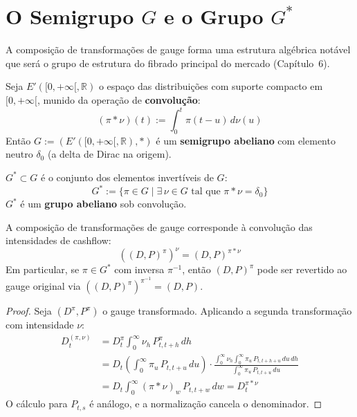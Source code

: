 \section{O Semigrupo $G$ e o Grupo $G^*$}\label{sec:semigrupo}

A composi\c{c}\~ao de transforma\c{c}\~oes de gauge forma uma
estrutura alg\'ebrica not\'avel que ser\'a o grupo de estrutura do
fibrado principal do mercado (Cap\'itulo~6).

\begin{defi}[O Semigrupo $G$]\label{def:semi_grupo}
Seja $E'([0,+\infty[,\mathbb{R})$ o espa\c{c}o das distribui\c{c}\~oes
com suporte compacto em $[0,+\infty[$, munido da opera\c{c}\~ao de
\textbf{convolu\c{c}\~ao}:
\[
(\pi * \nu)(t) := \int_0^t \pi(t-u)\,d\nu(u)
\]
Ent\~ao $G := (E'([0,+\infty[,\mathbb{R}), *)$ \'e um \textbf{semigrupo
abeliano} com elemento neutro $\delta_0$ (a delta de Dirac na origem).
\end{defi}

\begin{defi}[O Grupo $G^*$]\label{def:grupo_estrela}
$G^* \subset G$ \'e o conjunto dos elementos invert\'iveis de $G$:
\[
G^* := \{\pi \in G \mid \exists\,\nu \in G \text{ tal que } \pi * \nu = \delta_0\}
\]
$G^*$ \'e um \textbf{grupo abeliano} sob convolu\c{c}\~ao.
\end{defi}

\begin{prop}\label{prop:composicao}
A composi\c{c}\~ao de transforma\c{c}\~oes de gauge corresponde
\`a convolu\c{c}\~ao das intensidades de cashflow:
\[
\boxed{((D,P)^\pi)^\nu = (D,P)^{\pi * \nu}}
\]
Em particular, se $\pi \in G^*$ com inversa $\pi^{-1}$, ent\~ao
$(D,P)^\pi$ pode ser revertido ao gauge original via
$((D,P)^\pi)^{\pi^{-1}} = (D,P)$.
\end{prop}

\begin{proof}
Seja $(D^\pi, P^\pi)$ o gauge transformado. Aplicando a segunda
transforma\c{c}\~ao com intensidade $\nu$:
\begin{align*}
 D_t^{(\pi,\nu)}
 &= D_t^\pi \int_0^\infty \nu_h\, P_{t,t+h}^\pi\,dh \\[4pt]
 &= D_t \left(\int_0^\infty \pi_u\, P_{t,t+u}\,du\right) \cdot
 \frac{\int_0^\infty \nu_h \int_0^\infty \pi_u\, P_{t,t+h+u}\,du\,dh}
 {\int_0^\infty \pi_u\, P_{t,t+u}\,du} \\[4pt]
 &= D_t \int_0^\infty (\pi * \nu)_w\, P_{t,t+w}\,dw = D_t^{\pi * \nu}
\end{align*}
O c\'alculo para $P_{t,s}$ \'e an\'alogo, e a normaliza\c{c}\~ao
cancela o denominador.
\end{proof}

